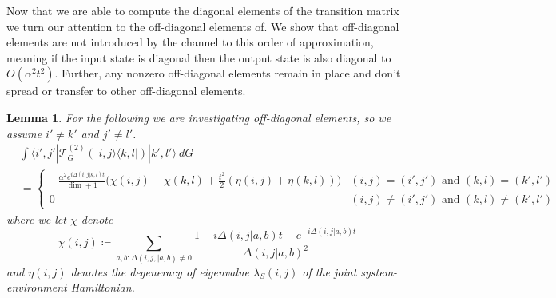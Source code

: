 \documentclass{article}
\newtheorem{lemma}[theorem]{Lemma}
\newcommand{\ket}[1]{|#1\rangle}
\newcommand{\bra}[1]{\langle #1|}
\newcommand{\ketbra}[2]{| #1\rangle\! \langle #2|}
\newcommand{\bigo}[1]{O\left( #1 \right)}
\begin{document}
Now that we are able to compute the diagonal elements of the transition matrix we turn our attention to the off-diagonal elements of. We show that off-diagonal elements are not introduced by the channel to this order of approximation, meaning if the input state is diagonal then the output state is also diagonal to $\bigo{\alpha^2 t^2}$. Further, any nonzero off-diagonal elements remain in place and don't spread or transfer to other off-diagonal elements. 
\begin{lemma} \label{lem:off_diagonal_elems}
     For the following we are investigating off-diagonal elements, so we assume $i' \neq k'$ and $j' \neq l'$.
    \begin{align}
    &\int \bra{i', j'}  \mathcal{T}^{(2)}_G \left( \ketbra{i, j}{k, l} \right) \ket{k', l'} ~dG \\
    &=\begin{cases}
        -\frac{\alpha^2 e^{i \Delta(i,j|k,l) t}}{\dim + 1} \bigg( \chi(i,j) + \chi(k,l) + \frac{t^2}{2}(\eta(i,j) + \eta(k,l)) \bigg) & (i, j) = (i', j') \text{ and } (k, l) = (k', l') \\
        0 & (i, j) \neq (i', j') \text{ and } (k, l) \neq (k', l')
    \end{cases}
    \end{align}
    where we let $\chi$ denote
    \begin{equation}
        \chi(i,j) \coloneqq \sum_{a,b: \Delta(i,j,|a,b) \neq 0} \frac{1 - i \Delta(i,j|a,b)t - e^{-i \Delta(i,j|a,b) t}}{\Delta(i,j|a,b)^2}
    \end{equation}
    and $\eta(i,j)$ denotes the degeneracy of eigenvalue $\lambda_S(i,j)$ of the joint system-environment Hamiltonian. 
\end{lemma}
\end{document}
